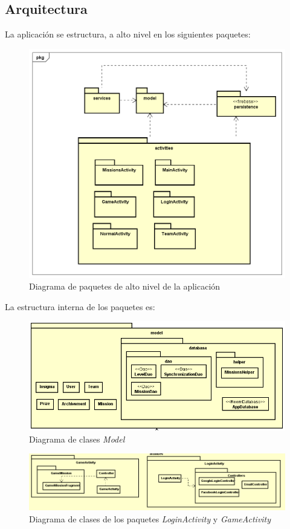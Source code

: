 \documentclass[twoside]{report}
\begin{document}
\subsection{Arquitectura}
La aplicación se estructura, a alto nivel en los siguientes paquetes:
\begin{figure}[H]
\centering
\includegraphics[scale=0.5]{images/structureHighLevel}
\caption{Diagrama de paquetes de alto nivel de la aplicación}
\end{figure}

La estructura interna de los paquetes es:

\begin{figure}[H]
\centering
\includegraphics[scale=0.6]{images/structureModel}
\caption{Diagrama de clases \textit{Model}}
\end{figure}

\begin{figure}[H]
\centering
\includegraphics[scale=0.7]{images/structureLoginGameModel}
\caption{Diagrama de clases de los paquetes \textit{LoginActivity} y \textit{GameActivity}}
\end{figure}
\end{document}
